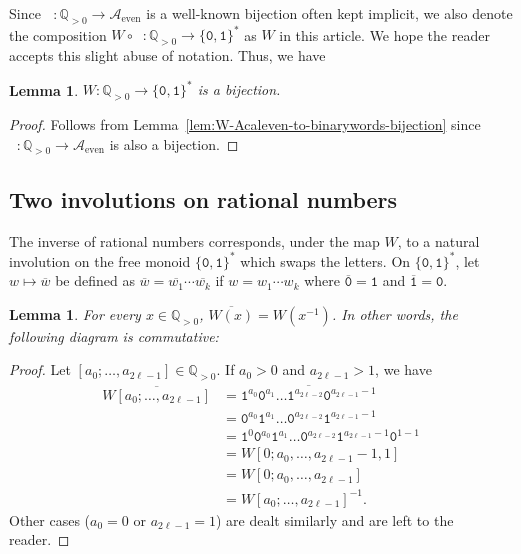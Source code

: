 \documentclass[a4paper,12pt]{amsart}
\newtheorem{lemma}[definition]{Lemma}
\newcommand{\Q}{\mathbb{Q}}
\newcommand{\Acal}{{\mathcal{A}}}
\newcommand{\0}{\mathtt{0}}
\newcommand{\1}{\mathtt{1}}
\newcommand{\2}{\mathtt{2}}
\newcommand{\3}{\mathtt{3}}
\newcommand{\Acaleven}{{\Acal_{\text{even}}}}
\DeclareMathOperator{\CFeven}{{CF_{\text{even}}}}
\begin{document}
Since $\CFeven:\Q_{>0}\to\Acaleven$ is a well-known bijection
often kept implicit, we also denote the composition
$W\circ\CFeven:\Q_{>0}\to\{\0,\1\}^*$ as $W$ in this article.
We hope the reader accepts this slight abuse of notation.
Thus, we have

\begin{lemma}
    $W:\Q_{>0}\to\{\0,\1\}^*$ is a bijection.
\end{lemma}

\begin{proof}
    Follows from Lemma~\ref{lem:W-Acaleven-to-binarywords-bijection}
    since $\CFeven:\Q_{>0}\to\Acaleven$ is also a bijection.
\end{proof}

\subsection{Two involutions on rational numbers}
The inverse of rational numbers
corresponds, under the map $W$, to a natural involution
on the free monoid $\{\0,\1\}^*$ which swaps the letters.
On $\{\0,\1\}^*$, let $w \mapsto \overline{w}$ be defined as
$\overline{w} = \overline{w_1} \cdots \overline{w_k}$ if $w = w_1 \cdots w_k$
where
$\overline{\0}=\1$
and
$\overline{\1}=\0$.

\begin{lemma}\label{lem:map-W-commutes-inverse-bar}
    For every $x\in\Q_{>0}$, $\overline{W(x)}=W(x^{-1})$.
    In other words, the following diagram is commutative:
\begin{center}
\end{center}
\end{lemma}

\begin{proof}
    Let $[a_0;\dots,a_{2\ell-1}]\in\Q_{>0}$.
    If $a_0>0$ and $a_{2\ell-1}>1$, we have
    \begin{align*}
    \overline{W[a_0;\dots,a_{2\ell-1}]}
        &=\overline{\1^{a_0}\0^{a_1}\dots \1^{a_{2\ell-2}}\0^{a_{2\ell-1}-1}}\\
        &=\0^{a_0}\1^{a_1}\dots \0^{a_{2\ell-2}}\1^{a_{2\ell-1}-1}\\
        &=\1^0\0^{a_0}\1^{a_1}\dots \0^{a_{2\ell-2}}\1^{a_{2\ell-1}-1}\0^{1-1}\\
        &=W[0;a_0,\dots,a_{2\ell-1}-1,1]\\
        &=W[0;a_0,\dots,a_{2\ell-1}]\\
        &=W[a_0;\dots,a_{2\ell-1}]^{-1}.
    \end{align*}
    Other cases ($a_0=0$ or $a_{2\ell-1}=1$) are dealt similarly and are left to the reader.
\end{proof}
\end{document}
